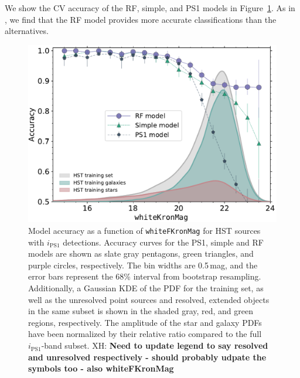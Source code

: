 \documentclass[twocolumn]{aastex63}
\newcommand{\xander}[1]{{\color{red} XH: \textbf{#1}}}
\begin{document}


We show the CV accuracy of the RF, simple, and PS1 models in
Figure~\ref{fig:hst_acc}. As in \citet{Tachibana18}, we find that the RF
model provides more accurate classifications than the alternatives.

\begin{figure}[t]
 \centering
  \includegraphics[width=\columnwidth]{./figures/CV_Accuracy_FHST.pdf}
  \caption{Model accuracy as a function of \texttt{whiteFKronMag} for HST
  sources with $i_\mathrm{PS1}$ detections. Accuracy curves for the PS1,
  simple and RF models are shown as slate gray pentagons, green triangles, and
  purple circles, respectively. The bin widths are 0.5\,mag, and the error
  bars represent the 68\% interval from bootstrap resampling. Additionally, a
  Gaussian KDE of the PDF for the training set, as well as the unresolved
  point sources and resolved, extended objects in the same subset is shown in
  the shaded gray, red, and green regions, respectively. The amplitude of the
  star and galaxy PDFs have been normalized by their relative ratio compared
  to the full $i_\mathrm{PS1}$-band subset. \xander{Need to update legend to
  say resolved and unresolved respectively - should probably udpate the
  symbols too - also whiteFKronMag}}
  \label{fig:hst_acc}
\end{figure}  
\end{document}
